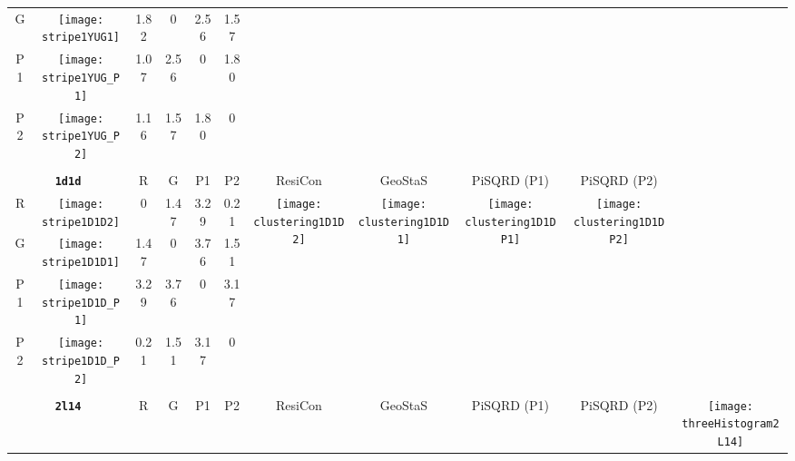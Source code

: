 \documentclass[a4paper,11pt,twoside]{book}%
\begin{document}
\begin{appendices}
\begin{sidewaystable}[h!]
\begin{tabular*}{4cm}{cc|c|c|c|c|c|c|c|c|c|}
\cline{1-6}
\multicolumn{1}{|c|}{G} & \texttt{[image: stripe1YUG1]} & 1.82 & 0 & 2.56 & 1.57 & \multirow{4}{*}{} & \multirow{4}{*}{} & \multirow{4}{*}{} & \multirow{4}{*}{} & \multirow{5}{*}{} \\
\cline{1-6}
\multicolumn{1}{|c|}{P1} & \texttt{[image: stripe1YUG\_P1]} & 1.07 & 2.56 & 0 & 1.80 & \multirow{4}{*}{} & \multirow{4}{*}{} & \multirow{4}{*}{} & \multirow{4}{*}{} & \multirow{5}{*}{}  \\
\cline{1-6}
\multicolumn{1}{|c|}{P2} & \texttt{[image: stripe1YUG\_P2]} & 1.16 & 1.57 & 1.80 & 0 & \multirow{4}{*}{} & \multirow{4}{*}{} & \multirow{4}{*}{} & \multirow{4}{*}{} & \multirow{5}{*}{}  \\
\cline{1-11}
\\
\cline{1-11}
\multicolumn{2}{|c|}{{\bf \texttt{1d1d}}} & R & G & P1 & P2 & ResiCon & GeoStaS & PiSQRD (P1) & PiSQRD (P2) & \multirow{5}{*}{\vspace{-0.15cm}\texttt{[image: threeHistogram1D1D]}}  \\  
\cline{1-10}
\multicolumn{1}{|c|}{R} & \texttt{[image: stripe1D1D2]} & 0 & 1.47 & 3.29 & 0.21 & \multirow{4}{*}{\vspace{-0.3cm}\texttt{[image: clustering1D1D2]}} & \multirow{4}{*}{\vspace{-0.3cm}\texttt{[image: clustering1D1D1]}} & \multirow{4}{*}{\vspace{-0.3cm}\texttt{[image: clustering1D1DP1]}} & \multirow{4}{*}{\vspace{-0.3cm}\texttt{[image: clustering1D1DP2]}} &  \multirow{5}{*}{} \\ 
\cline{1-6}
\multicolumn{1}{|c|}{G} & \texttt{[image: stripe1D1D1]} & 1.47 & 0 & 3.76 & 1.51 & \multirow{4}{*}{} & \multirow{4}{*}{} & \multirow{4}{*}{} & \multirow{4}{*}{} & \multirow{5}{*}{} \\
\cline{1-6}
\multicolumn{1}{|c|}{P1} & \texttt{[image: stripe1D1D\_P1]} & 3.29 & 3.76 & 0 & 3.17 & \multirow{4}{*}{} & \multirow{4}{*}{} & \multirow{4}{*}{} & \multirow{4}{*}{} & \multirow{5}{*}{}  \\
\cline{1-6}
\multicolumn{1}{|c|}{P2} & \texttt{[image: stripe1D1D\_P2]} & 0.21 & 1.51 & 3.17 & 0 & \multirow{4}{*}{} & \multirow{4}{*}{} & \multirow{4}{*}{} & \multirow{4}{*}{} & \multirow{5}{*}{}  \\
\cline{1-11}
\\
\cline{1-11}
\multicolumn{2}{|c|}{{\bf \texttt{2l14}}} & R & G & P1 & P2 & ResiCon & GeoStaS & PiSQRD (P1) & PiSQRD (P2) & \multirow{5}{*}{\vspace{-0.15cm}\texttt{[image: threeHistogram2L14]}}  \\

\end{tabular*}
\end{sidewaystable}
\end{appendices}
\end{document}
